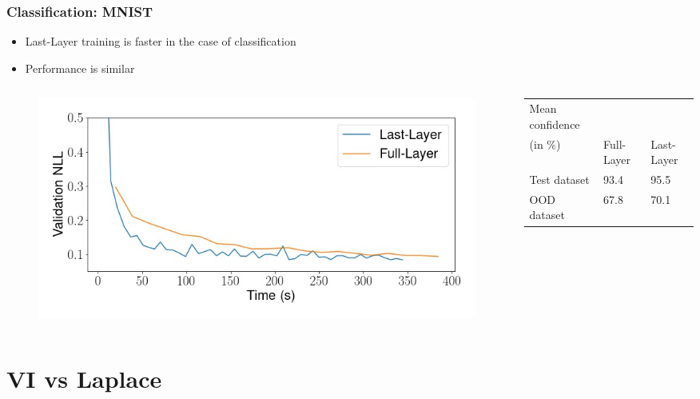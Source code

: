 \documentclass{beamer}
\begin{document}
        \begin{frame}
            \frametitle{Classification: MNIST}
            \begin{itemize}
                \item Last-Layer training is faster in the case of classification
                \item Performance is similar
            \end{itemize}
            \begin{columns}
                \begin{column}{0.5\textwidth}
                    \begin{figure}
                        \includegraphics[width=1.1\textwidth]{images/Classification/LLvsFull2.jpg}
                    \end{figure}                  
                \end{column}
                \begin{column}{0.5\textwidth}                
                    \begin{tabular}{p{}|p{}|p{}}
                        Mean confidence\\ (in \%)&Full-Layer & Last-Layer\\
                        \hline
                        Test dataset & 93.4 & 95.5\\
                        OOD dataset & 67.8 & 70.1
                    \end{tabular}
                \end{column}
            \end{columns}
        \end{frame}


        \section{VI vs Laplace}
\end{document}
